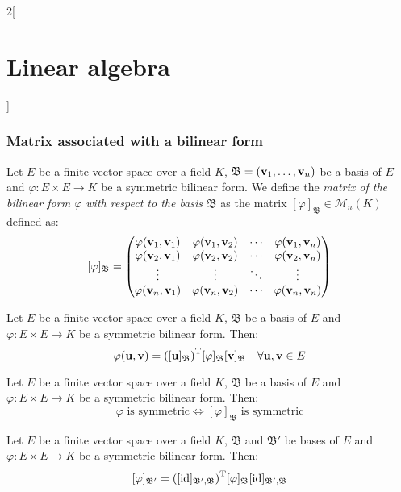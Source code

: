 \documentclass[../../../main.tex]{subfiles}
\begin{document}
\begin{multicols}{2}[\section{Linear algebra}]
\subsubsection*{Matrix associated with a bilinear form}
\begin{definition}
    Let $E$ be a finite vector space over a field $K$, $\mathfrak{B}=(\vb{v}_1,\ldots,\vb{v}_n)$ be a basis of $E$ and $\varphi:E\times E\rightarrow K$ be a symmetric bilinear form. We define the \textit{matrix of the bilinear form $\varphi$ with respect to the basis $\mathfrak{B}$} as the matrix $[\varphi]_\mathfrak{B}\in\mathcal{M}_n(K)$ defined as: $$[\varphi]_\mathfrak{B}=
    \begin{pmatrix}
        \varphi(\vb{v}_1,\vb{v}_1) & \varphi(\vb{v}_1,\vb{v}_2) & \cdots & \varphi(\vb{v}_1,\vb{v}_n) \\
        \varphi(\vb{v}_2,\vb{v}_1) & \varphi(\vb{v}_2,\vb{v}_2) & \cdots & \varphi(\vb{v}_2,\vb{v}_n) \\
        \vdots & \vdots & \ddots & \vdots \\
        \varphi(\vb{v}_n,\vb{v}_1) & \varphi(\vb{v}_n,\vb{v}_2) & \cdots & \varphi(\vb{v}_n,\vb{v}_n) \\
    \end{pmatrix}$$ 
\end{definition}
\begin{lemma}
    Let $E$ be a finite vector space over a field $K$, $\mathfrak{B}$ be a basis of $E$ and $\varphi:E\times E\rightarrow K$ be a symmetric bilinear form. Then:
    $$\varphi(\vb{u},\vb{v})={\left([\vb{u}]_\mathfrak{B}\right)}^\mathrm{T}[\varphi]_\mathfrak{B}[\vb{v}]_\mathfrak{B}\quad\forall\vb{u},\vb{v}\in E$$
\end{lemma}
\begin{prop}
    Let $E$ be a finite vector space over a field $K$, $\mathfrak{B}$ be a basis of $E$ and $\varphi:E\times E\rightarrow K$ be a symmetric bilinear form. Then: $$\varphi\text{ is symmetric}\iff[\varphi]_\mathfrak{B}\text{ is symmetric}$$
\end{prop}
\begin{prop}
    Let $E$ be a finite vector space over a field $K$, $\mathfrak{B}$ and $\mathfrak{B}'$ be bases of $E$ and $\varphi:E\times E\rightarrow K$ be a symmetric bilinear form. Then: $$[\varphi]_{\mathfrak{B}'}={([\mathrm{id}]_{\mathfrak{B}',\mathfrak{B}})}^\mathrm{T}[\varphi]_\mathfrak{B}[\mathrm{id}]_{\mathfrak{B}',\mathfrak{B}}$$
\end{prop}

\end{multicols}
\end{document}
